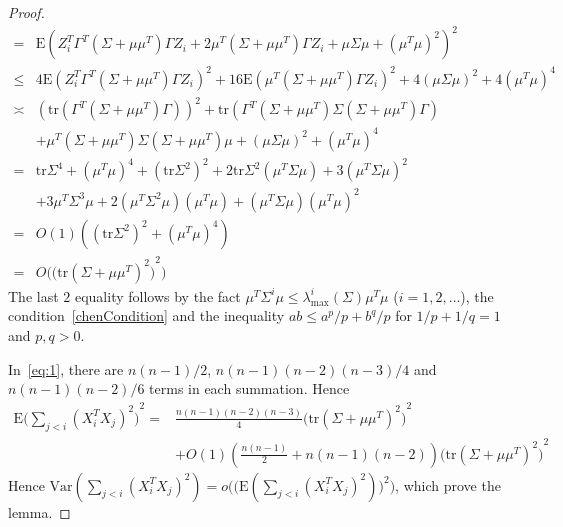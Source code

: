 \documentclass[review]{elsarticle}
\theoremstyle{plain}
\theoremstyle{definition}
\theoremstyle{remark}
\begin{document}
\begin{proof}
\begin{equation}
\begin{aligned}
            =&
            \mathrm{E}{(Z_i^T \Gamma^T (\Sigma+\mu\mu^T) \Gamma Z_i+ 2\mu^T (\Sigma+\mu\mu^T)\Gamma Z_i +\mu \Sigma \mu +(\mu^T\mu)^2 )}^2\\
            \leq&
            4\mathrm{E}(Z_i^T \Gamma^T (\Sigma+\mu\mu^T) \Gamma Z_i)^2+ 16\mathrm{E}(\mu^T (\Sigma+\mu\mu^T)\Gamma Z_i)^2 +4(\mu \Sigma \mu)^2 +4(\mu^T\mu)^4 \\
            \asymp&
            (\mathrm{tr}(\Gamma^T (\Sigma+\mu\mu^T)\Gamma))^2+\mathrm{tr}(\Gamma^T (\Sigma+\mu\mu^T)\Sigma(\Sigma+\mu\mu^T)\Gamma)\\
            &+ \mu^T (\Sigma+\mu\mu^T)\Sigma (\Sigma+\mu\mu^T)\mu+(\mu \Sigma \mu)^2 +(\mu^T\mu)^4 \\
            =&
            \mathrm{tr}\Sigma^4+
            {(\mu^T \mu)}^4+
            {(\mathrm{tr}\Sigma^2)}^2+
            2\mathrm{tr}\Sigma^2 (\mu^T \Sigma \mu)+
            3 {(\mu^T \Sigma \mu)}^2\\
            &+
            3\mu^T\Sigma^3 \mu+
            2(\mu^T\Sigma^2 \mu)(\mu^T\mu)+
            (\mu^T\Sigma \mu){(\mu^T\mu)}^2\\
            =&
            O(1)({(\mathrm{tr}\Sigma^2)}^2+(\mu^T\mu)^4)\\
            =&O\Big({\big(\mathrm{tr}(\Sigma+\mu\mu^T)^2\big)}^2\Big)
        \end{aligned}
    \end{equation}
    The last $2$ equality follows by the fact $\mu^T \Sigma^i \mu\leq \lambda_{\max}^i(\Sigma)\mu^T\mu$ ($i=1,2,\ldots$), the condition~\eqref{chenCondition} and the inequality $ab\leq a^p/p+b^q/p$ for $1/p+1/q=1$ and $p,q>0$.
   
   In~\eqref{eq:1}, there are $n(n-1)/2$, $n(n-1)(n-2)(n-3)/4$ and $n(n-1)(n-2)/6$ terms in each summation. Hence
    \begin{equation}
    \begin{aligned}
        \mathrm{E}{\big(\sum_{j<i}{(X_i^T X_j)}^2\big)}^2
            =&\frac{n(n-1)(n-2)(n-3)}{4}{\big(\mathrm{tr}(\Sigma+\mu\mu^T)^2\big)}^2\\
            &+O(1)(\frac{n(n-1)}{2}+n(n-1)(n-2)){\big(\mathrm{tr}(\Sigma+\mu\mu^T)^2\big)}^2
    \end{aligned}
    \end{equation}
Hence $\mathrm{Var}(\sum_{j<i}{(X_i^T X_j)}^2)=o\Big(\big(\mathrm{E}(\sum_{j<i}{(X_i^T X_j)}^2)\big)^2\Big)$, which prove the lemma.
\end{proof}
\end{document}
